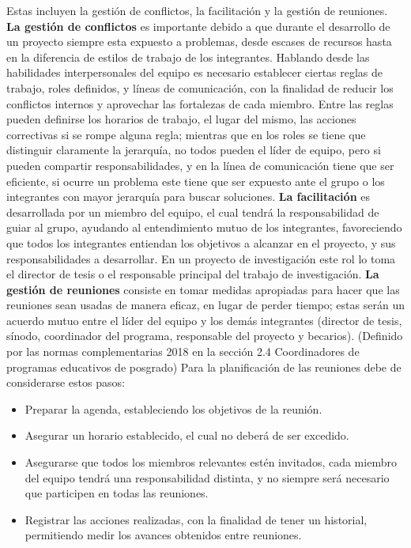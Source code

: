 \documentclass[letterpaper,12pt,openright,oneside]{article}
\theoremstyle{plain}
\begin{document}
Estas incluyen la gestión de conflictos, la facilitación y la gestión de reuniones.
\textbf{La gestión de conflictos} es importante debido a que durante el desarrollo de un proyecto siempre esta expuesto a problemas, desde escases de recursos hasta en la diferencia de estilos de trabajo de los integrantes. 
Hablando desde las habilidades interpersonales del equipo es necesario establecer ciertas reglas de trabajo, roles definidos, y líneas de comunicación, con la finalidad de reducir los conflictos internos y aprovechar las fortalezas de cada miembro. 
Entre las reglas pueden definirse los horarios de trabajo, el lugar del mismo, las acciones correctivas si se rompe alguna regla; mientras que en los roles se tiene que distinguir claramente la jerarquía, no todos pueden el líder de equipo, pero si pueden compartir responsabilidades, y en la línea de comunicación tiene que ser eficiente, si ocurre un problema este tiene que ser expuesto ante el grupo o los integrantes con mayor jerarquía para buscar soluciones.
\textbf{La facilitación} es desarrollada por un miembro del equipo, el cual tendrá la responsabilidad de guiar al grupo, ayudando al entendimiento mutuo de los integrantes, favoreciendo que todos los integrantes entiendan los objetivos a alcanzar en el proyecto, y sus responsabilidades a desarrollar.
En un proyecto de investigación este rol lo toma el director de tesis o el responsable principal del trabajo de investigación.
\textbf{La gestión de reuniones} consiste en tomar medidas apropiadas para hacer que las reuniones sean usadas de manera eficaz, en lugar de perder tiempo; 
estas serán un acuerdo mutuo entre el líder del equipo y los demás integrantes (director de tesis, sínodo, coordinador del programa, responsable del proyecto y becarios). (Definido por las normas complementarias 2018 en la sección 2.4 Coordinadores de programas educativos de posgrado)
Para la planificación de las reuniones debe de considerarse estos pasos:

\begin{itemize}
    \item Preparar la agenda, estableciendo los objetivos de la reunión.
    \item Asegurar un horario establecido, el cual no deberá de ser excedido.
    \item Asegurarse que todos los miembros relevantes estén invitados, cada miembro del equipo tendrá una responsabilidad distinta, y no siempre será necesario que participen en todas las reuniones.
    \item Registrar las acciones realizadas, con la finalidad de tener un historial, permitiendo medir los avances obtenidos entre reuniones.
\end{itemize}
\end{document}
